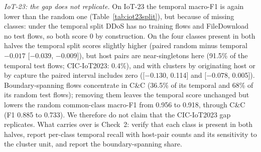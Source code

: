 \emph{IoT-23: the gap does not replicate.} On IoT-23 the temporal macro-F1 is again lower than the random one (Table~\ref{tab:iot23split}), but because of missing classes: under the temporal split DDoS has no training flows and FileDownload no test flows, so both score 0 by construction. On the four classes present in both halves the temporal split scores slightly higher (paired random minus temporal $-0.017$ [$-0.039$, $-0.009$]), but host pairs are near-singletons here (91.5\% of the temporal test flows; CIC-IoT2023: 0.4\%), and with clusters by originating host or by capture the paired interval includes zero ([$-0.130$, 0.114] and [$-0.078$, 0.005]). Boundary-spanning flows concentrate in C\&C (36.5\% of its temporal and 68\% of its random test flows); removing them leaves the temporal score unchanged but lowers the random common-class macro-F1 from 0.956 to 0.918, through C\&C (F1 0.885 to 0.733). We therefore do not claim that the CIC-IoT2023 gap replicates. What carries over is Check~2: verify that each class is present in both halves, report per-class temporal recall with host-pair counts and its sensitivity to the cluster unit, and report the boundary-spanning share.
